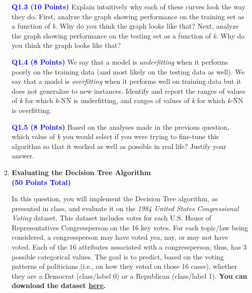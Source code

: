 \documentclass[]{article}
\newcommand{\HIGHLIGHT}[1]{\textcolor{blue}{\textbf{#1}}}
\begin{document}
\begin{enumerate}
    \HIGHLIGHT{Q1.3 (10 Points)} Explain intuitively why each of these curves look the way they do. First, analyze the graph showing performance on the training set as a function of \textit{k}. Why do you think the graph looks like that? Next, analyze the graph showing performance on the testing set as a function of \textit{k}. Why do you think the graph looks like that?
    
    
    \HIGHLIGHT{Q1.4 (8 Points)} We say that a model is \textit{underfitting} when it performs poorly on the training data (and most likely on the testing data as well). We say that a model is \textit{overfitting} when it performs well on training data but it does not generalize to new instances. Identify and report the ranges of values of \textit{k} for which \textit{k}-NN is underfitting, and ranges of values of \textit{k} for which \textit{k}-NN is overfitting.
    
    
    \HIGHLIGHT{Q1.5 (8 Points)} Based on the analyses made in the previous question, which value of \textit{k} you would select if you were trying to fine-tune this algorithm so that it worked as well as possible in real life? Justify your answer.
    
    
    
    
    
    \vspace{0.5in}
    \item {\LARGE{\textbf{Evaluating the Decision Tree Algorithm}}} \\\HIGHLIGHT{(50 Points Total)}\\
    \vspace{0.1in}

    In this question, you will implement the Decision Tree algorithm, as presented in class, and evaluate it on the \textit{1984 United States Congressional Voting} dataset. This dataset includes votes for each U.S. House of Representatives Congressperson on the 16 key votes. For each topic/law being considered, a congressperson may have voted yea, nay, or may not have voted. Each of the 16 attributes associated with a congressperson, thus, has 3 possible categorical values. The goal is to predict, based on the voting patterns of politicians (i.e., on how they voted on those 16 cases), whether they are a Democrat (class/label 0) or a Republican (class/label 1). \textbf{You can download the dataset \href{https://people.cs.umass.edu/~bsilva/courses/CMPSCI_589/Spring2022/homeworks/datasets/house_votes_84.csv}{here}.}
    

\end{enumerate}
\end{document}
